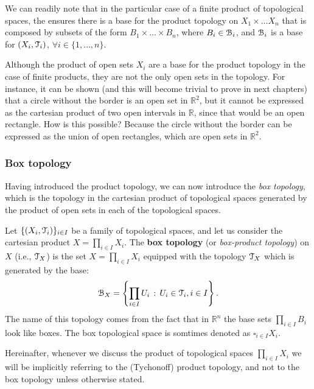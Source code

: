 We can readily note that in the particular case of a finite product of topological spaces,
the  ensures there is a base for the product topology
on $X_1\times\ldots X_n$ that is composed by subsets of the form $B_1\times\ldots\times B_n$,
where $B_i\in \EuScript{B}_i$, and $\EuScript{B}_i$ is a base for $(X_i, \EuScript{T}_i)$, $\forall i\in\{1,\ldots,n\}$.

\begin{remark}
	Although the product of open sets $X_i$ are a base for the product topology in the case of
	finite products, they are not the only open sets in the topology.
	For instance, it can be shown (and this will become trivial to prove in next chapters) that
	a circle without the border is an open set in $\mathbb{R}^2$, but it cannot be expressed as
	the cartesian product of two open intervals in $\mathbb{R}$, since that would be an open
	rectangle. How is this possible? Because the circle without the border can be expressed as the union
	of open rectangles, which are open sets in $\mathbb{R}^2$.
\end{remark}

\subsubsection{Box topology}\label{subsec:box-topology}

Having introduced the product topology, we can now introduce the \emph{box topology},
which is the topology in the cartesian product of topological spaces generated by the
product of open sets in each of the topological spaces.

\begin{definition}
	\label{def:box-topology}
	Let $\{(X_i, \EuScript{T}_i)\}_{i\in I}$ be a family of topological spaces, and let us consider
	the cartesian product $X=\prod_{i\in I} X_i$.
	The \textbf{box topology} (or \emph{box-product topology}) on $X$ (i.e., $\EuScript{T}_{X}$) is
	the set $X=\prod_{i\in I}X_i$ equipped with the topology $\EuScript{T}_X$ which is generated by the base:
	$$
		\EuScript{B}_X = \left\{\prod_{i\in I}U_i\,:\,U_i\in\EuScript{T}_i, i\in I\right\}.
	$$
	The name of this topology comes from the fact that in $\mathbb{R}^n$ the base sets
	$\prod_{i\in I}B_i$ look like boxes.
	The box topological space is somtimes denoted as $\square_{i\in I}X_i$.
\end{definition}

Hereinafter, whenever we discuss the product of topological spaces
$\prod_{i\in I}X_i$ we will be implicitly referring to the (Tychonoff) product topology,
and not to the box topology unless otherwise stated.

